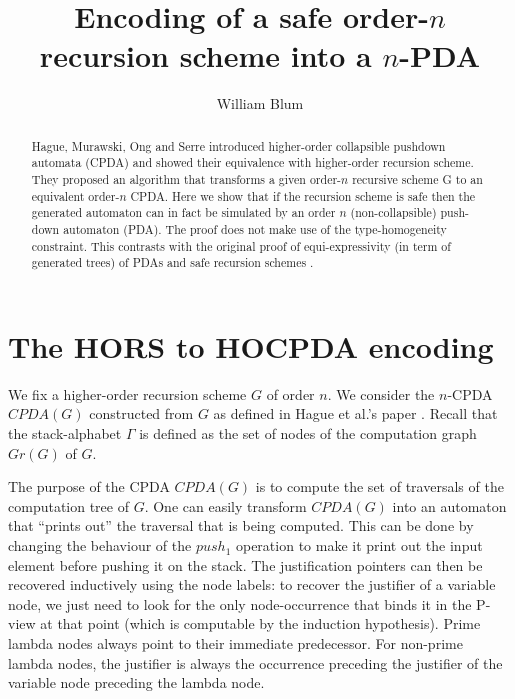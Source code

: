 \documentclass[a4paper]{article}
\author{William Blum}
\title{Encoding of a safe order-$n$ recursion scheme into a $n$-PDA}
\theoremstyle{remark}
\theoremstyle{definition}
\begin{document}
\maketitle
{}

\begin{abstract}
Hague, Murawski, Ong and Serre \cite{hmos-lics08} introduced
higher-order collapsible pushdown automata (CPDA) and showed their
equivalence with higher-order recursion scheme. They proposed an
algorithm that transforms a given order-$n$ recursive  scheme G to
an equivalent order-$n$ CPDA. Here we show that if the recursion
scheme is safe then the generated automaton can in fact be simulated by an order
$n$ (non-collapsible) push-down automaton (PDA). The proof does not make
use of the type-homogeneity constraint. This contrasts with the original proof
of equi-expressivity (in term of generated trees) of PDAs and safe recursion schemes \cite{KNU02}.
\end{abstract}




\section{The HORS to HOCPDA encoding}

We fix a higher-order recursion scheme $G$ of order $n$.
We consider the $n$-CPDA $CPDA(G)$ constructed from $G$ as defined in Hague et al.'s paper \cite[Definition 5.2]{hague-collaps-full}.
Recall that the stack-alphabet $\Gamma$ is defined as the set of nodes of the computation graph $Gr(G)$ of $G$.

The purpose of the CPDA $CPDA(G)$ is to compute the set of traversals of the computation tree of $G$. One can easily transform $CPDA(G)$ into an automaton that ``prints out'' the traversal that is being computed. This can be done by changing the behaviour of the $push_1$ operation to make it print out the input element before pushing it on the stack. The justification pointers can then be recovered
inductively using the node labels: to recover the justifier of a variable node, we just need to look for the only node-occurrence that binds it in the P-view at that point (which is computable by the induction hypothesis).
Prime lambda nodes always point to their immediate predecessor. For non-prime lambda nodes, the justifier is always the occurrence preceding the justifier of the variable node preceding the lambda node.
\end{document}
